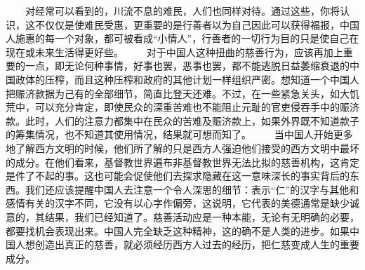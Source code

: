 \documentclass[12pt,oneside]{book}
\begin{document}
\begin{common-format}
　　对经常可以看到的，川流不息的难民，人们也同样对待。通过这些，你将认识，这不仅仅是使难民受惠，更重要的是行善者以为自己因此可以获得福报，中国人施惠的每一个对象，都可被看成“小情人”，行善者的一切行为目的只是使自己在现在或未来生活得更好些。 
　　对于中国人这种扭曲的慈善行为，应该再加上重要的一点，即无论何种事情，好事也罢，恶事也罢，都不能逃脱日益萎缩衰退的中国政体的压榨，而且这种压榨和政府的其他计划一样组织严密。想知道一个中国人把赈济款据为己有的全部细节，简直比登天还难。不过，在一些紧急关头，如大饥荒中，可以充分肯定，即使民众的深重苦难也不能阻止元耻的官吏侵吞手中的赈济款。此时，人们的注意力都集中在民众的苦难及赈济款上，如果外界既不知道款子的筹集情况，也不知道其使用情况，结果就可想而知了。 
　　当中国人开始更多地了解西方文明的时候，他们所了解的只是西方人强迫他们接受的西方文明中最坏的成分。在他们看来，基督教世界遍布非基督教世界无法比拟的慈善机构，这肯定是件了不起的事。这也可能会促使他们去探求隐藏在这一意味深长的事实背后的东西。我们还应该提醒中国人去注意一个令人深思的细节：表示“仁”的汉字与其他和感情有关的汉字不同，它没有以心字作偏旁，这说明，它代表的美德通常是缺少诚意的，其结果，我们已经知道了。慈善活动应是一种本能，无论有无明确的必要，都要找机会表现出来。中国人完全缺乏这种精神，这的确不是人类的进步。如果中国人想创造出真正的慈善，就必须经历西方人过去的经历，把仁慈变成人生的重要成分。 



\end{common-format}
\end{document}
